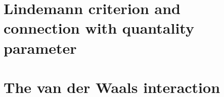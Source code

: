 \begin{subappendices}
\section{Lindemann criterion and connection with quantality parameter}\label{C2AppC}
\section{The van der Waals interaction}\label{C2AppD}













\end{subappendices}





\clearpage

\clearpage











\newpage
 
% 
 

